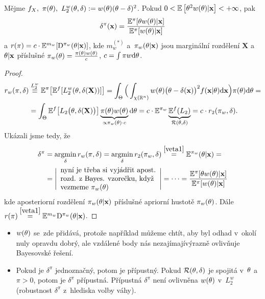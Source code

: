 \begin{theorem}
	Mějme $f_X,~\pi(\theta),~L_2^w(\theta,\delta):=w(\theta)(\theta-\delta)^2$. Pokud $0<\mathbb{E}\left[ \theta^2w(\theta)|\textbf{x} \right]<+\infty$, pak $$\delta^\pi(\textbf{x})=\frac{\mathbb{E}^\pi[{\theta w(\theta)|\textbf{x}}]}{\mathbb{E}^{\pi}[{w(\theta)|\textbf{x}}]}$$
	a $r(\pi)=c\cdot\mathbb{E}^{m_w}[\mathrm{D}^{\pi_w}(\theta|\textbf{x})]$, kde $m_w^{(*)}$ a~$\pi_w(\theta|\textbf{x})$ jsou marginální rozdělení $\textbf{X}$ a~$\theta|\textbf{x}$ příslušné $\pi_w(\theta)=\frac{\pi(\theta)w(\theta)}{c}$, $c=\int\pi w\mathrm{d}\theta$.
	\begin{proof}
		\[
		\begin{split}
		r_w(\pi,\delta)&\stackrel{L_2^w}{\equiv}\mathbb{E}^\pi\big[\mathbb{E}^f[L_2^w(\theta,\delta(\textbf{X}))]\big]=\int_\Theta\Big(\int_{\chi(\mathbb{R}^n)} w(\theta)\big(\theta-\delta(\textbf{x})\big)^2 f(\textbf{x}|\theta)\mathrm{d}\textbf{x}\Big)\pi(\theta)\mathrm{d}\theta=\\
		&= \int_\Theta \mathbb{E}^f\big[L_2\big(\theta,\delta(\textbf{X})\big)\big]\underbrace{ \pi(\theta)w(\theta)}_{\propto \pi_w(\theta)\cdot c}\mathrm{d}\theta = c\cdot\mathbb{E}^{\pi_w}\underbrace{\mathbb{E}^f (L_2)}_{\mathcal{R}(\theta,\delta)}=c\cdot r_2(\pi_w,\delta).
		\end{split}
		\]
		Ukázali jsme tedy, že  
		\begin{align*}
		\delta^\pi&=\mathop{\mathrm{argmin}}_\delta r_w(\pi,\delta)=\mathop{\mathrm{argmin}}_\delta r_2(\pi_w,\delta)\stackrel{\ref{veta1}}{=}\mathbb{E}^{\pi_w}(\theta|\textbf{x})=\\
		&=\Bigg| 
		\begin{array}{l}
		\text{nyní je třeba si vyjádřit apost.} \\
		\text{rozd. z~Bayes. vzorečku, když} \\
		\text{vezmeme } \pi_{w}(\theta)
		\end{array}
		\Bigg|=\dots=\frac{\mathbb{E}^\pi[{\theta w(\theta)|\textbf{x}}]}{\mathbb{E}^{\pi}[{w(\theta)|\textbf{x}}]}
		\end{align*} 
		kde aposteriorní rozdělení $\pi_w(\theta|\textbf{x})$ příslušné apriorní hustotě $\pi_w(\theta)$. Dále $r(\pi)\stackrel{\ref{veta1}}{=}\mathbb{E}^{m_w}\mathrm{D}^{\pi_w}(\theta|\textbf{x})$.
	\end{proof}
\end{theorem}
\begin{remark}\begin{itemize}
		\item $w(\theta)$ se~zde přidává, protože například můžeme chtít, aby byl odhad v~okolí nuly opravdu dobrý, ale vzdálené body nás nezajímajívýrazně ovlivňuje Bayesovské řešení.
		\item Pokud je $\delta^\pi$ jednoznačný, potom je přípustný. Pokud $\mathcal{R}(\theta,\delta)$ je spojitá v~$\theta$ a~$\pi>0$, potom je $\delta^\pi$ přípustná. Přípustná $\delta^\pi$ není ovlivněna $w(\theta)$ v~$L_2^w$ (robustnost $\delta^\pi$ z~hlediska volby váhy).
	\end{itemize}
\end{remark}

